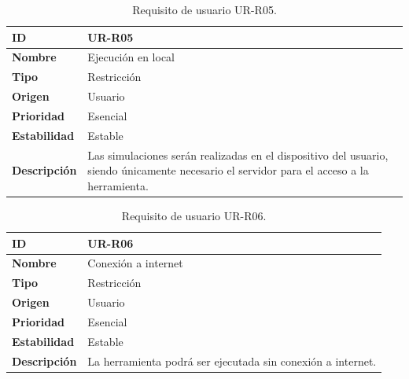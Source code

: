 \begin{center}
\begin{table}[htbp]
\centering
\caption{Requisito de usuario UR-R05.}
\begin{tabular}{@{}p{2.5cm} p{9cm}@{}} 
\toprule
\textbf{ID} 				& UR-R05 \\
\midrule
\textbf{Nombre} 			& Ejecución en local \\
\midrule
\textbf{Tipo} 			& Restricción \\
\midrule
\textbf{Origen} 			& Usuario \\
\midrule
\textbf{Prioridad}		& Esencial \\
\midrule
\textbf{Estabilidad} 		& Estable \\
\midrule
\textbf{Descripción} 	& Las simulaciones serán realizadas en el dispositivo del usuario, siendo únicamente necesario el servidor para el acceso a la herramienta. \\
\bottomrule
\end{tabular}
\label{tab:urr05}
\end{table}
\end{center}

\begin{center}
\begin{table}[htbp]
\centering
\caption{Requisito de usuario UR-R06.}
\begin{tabular}{@{}p{2.5cm} p{9cm}@{}} 
\toprule
\textbf{ID} 				& UR-R06 \\
\midrule
\textbf{Nombre} 			& Conexión a internet \\
\midrule
\textbf{Tipo} 			& Restricción \\
\midrule
\textbf{Origen} 			& Usuario \\
\midrule
\textbf{Prioridad}		& Esencial \\
\midrule
\textbf{Estabilidad} 		& Estable \\
\midrule
\textbf{Descripción} 	& La herramienta podrá ser ejecutada sin conexión a internet. \\
\bottomrule
\end{tabular}
\label{tab:urr06}
\end{table}
\end{center}

